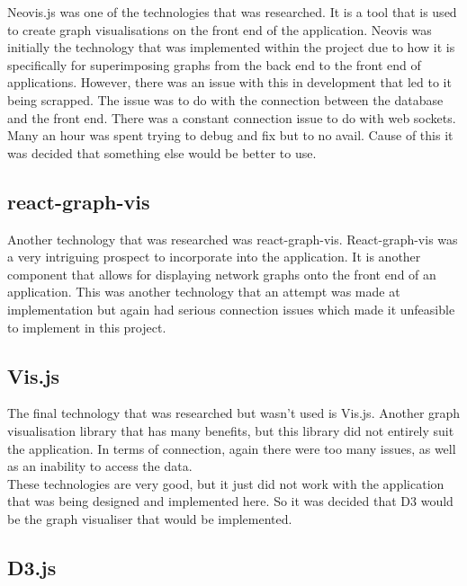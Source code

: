 Neovis.js was one of the technologies that was researched. It is a tool that is used to create graph visualisations on the front end of the application\cite{Neovis}. Neovis was initially the technology that was implemented within the project due to how it is specifically for superimposing graphs from the back end to the front end of applications. However, there was an issue with this in development that led to it being scrapped. The issue was to do with the connection between the database and the front end. There was a constant connection issue to do with web sockets. Many an hour was spent trying to debug and fix but to no avail. Cause of this it was decided that something else would be better to use.\cite{Neovis2}\\

\subsection{react-graph-vis}

Another technology that was researched was react-graph-vis. React-graph-vis was a very intriguing prospect to incorporate into the application. It is another component that allows for displaying network graphs onto the front end of an application. This was another technology that an attempt was made at implementation but again had serious connection issues which made it unfeasible to implement in this project.\cite{React-Graph-Vis} \\

\subsection{Vis.js}

The final technology that was researched but wasn’t used is Vis.js. Another graph visualisation library that has many benefits, but this library did not entirely suit the application. In terms of connection, again there were too many issues, as well as an inability to access the data.\cite{Vis.js} \\

These technologies are very good, but it just did not work with the application that was being designed and implemented here. So it was decided that D3 would be the graph visualiser that would be implemented. \\

\subsection{D3.js}

